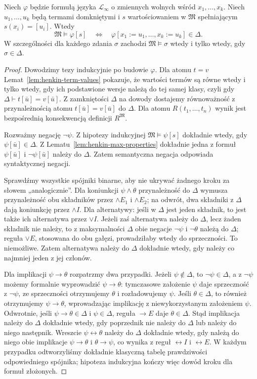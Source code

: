 \begin{twierdzenie}\label{thm:henkin-truth}
Niech $\varphi$ będzie formułą języka $\mathcal L_{\infty}$ o zmiennych wolnych wśród $x_1,\ldots,x_k$. Niech $u_1,\ldots,u_k$ będą termami domkniętymi i $s$ wartościowaniem w $\mathfrak M$ spełniającym $s(x_i)=[u_i]$. Wtedy
\[
\mathfrak M\models\varphi[s]
\quad\Longleftrightarrow\quad
\varphi[x_1:=u_1,\ldots,x_k:=u_k]\in\Delta.
\]
W szczególności dla każdego zdania $\sigma$ zachodzi $\mathfrak M\models\sigma$ wtedy i tylko wtedy, gdy $\sigma\in\Delta$.
\end{twierdzenie}
\begin{proof}
Dowodzimy tezy indukcyjnie po budowie $\varphi$. Dla atomu $t=v$ Lemat~\ref{lem:henkin-term-values} pokazuje, że wartości termów są równe wtedy i tylko wtedy, gdy ich podstawione wersje należą do tej samej klasy, czyli gdy $\Delta\vdash t[\bar u]=v[\bar u]$. Z zamkniętości $\Delta$ na dowody dostajemy równoważność z przynależnością atomu $t[\bar u]=v[\bar u]$ do $\Delta$. Dla atomu $R(t_1,\ldots,t_n)$ wynik jest bezpośrednią konsekwencją definicji $R^{\mathfrak M}$.

Rozważmy negację $\neg\psi$. Z hipotezy indukcyjnej
$\mathfrak M\models\psi[s]$ dokładnie wtedy, gdy
$\psi[\bar u]\in\Delta$. Z Lematu~\ref{lem:henkin-max-properties}
dokładnie jedna z formuł $\psi[\bar u]$ i
$\neg\psi[\bar u]$ należy do $\Delta$.
Zatem semantyczna negacja odpowiada syntaktycznej negacji.

Sprawdźmy wszystkie spójniki binarne, aby nie ukrywać
żadnego kroku za słowem „analogicznie”. Dla koniunkcji
$\psi\land\theta$ przynależność do $\Delta$ wymusza
przynależność obu składników przez $\land E_1$ i $\land E_2$;
na odwrót, dwa składniki z $\Delta$ dają koniunkcję przez
$\land I$. Dla alternatywy: jeśli w $\Delta$ jest jeden
składnik, to jest także ich alternatywa przez $\lor I$.
Jeżeli zaś alternatywa należy do $\Delta$, lecz żaden składnik
nie należy, to z maksymalności $\Delta$ obie negacje
$\neg\psi$ i $\neg\theta$ należą do $\Delta$;
reguła $\lor E$, stosowana do obu gałęzi,
prowadziłaby wtedy do sprzeczności. To niemożliwe.
Zatem alternatywa należy do $\Delta$ dokładnie wtedy,
gdy należy co najmniej jeden z jej członów.

Dla implikacji $\psi\to\theta$ rozpatrzmy dwa przypadki.
Jeżeli $\psi\notin\Delta$, to $\neg\psi\in\Delta$,
a z $\neg\psi$ możemy formalnie wyprowadzić
$\psi\to\theta$: tymczasowe założenie $\psi$
daje sprzeczność z $\neg\psi$,
ze sprzeczności otrzymujemy $\theta$ i rozładowujemy
$\psi$. Jeśli $\theta\in\Delta$, to również
otrzymujemy $\psi\to\theta$, wprowadzając implikację
z niewykorzystanym założeniem $\psi$.
Odwrotnie, jeśli $\psi\to\theta\in\Delta$
i $\psi\in\Delta$, reguła $\to E$ daje
$\theta\in\Delta$. Stąd implikacja należy do $\Delta$
dokładnie wtedy, gdy poprzednik nie należy do $\Delta$
lub należy do niego następnik.
Wreszcie $\psi\leftrightarrow\theta$ należy do $\Delta$
dokładnie wtedy, gdy należą do niego obie implikacje
$\psi\to\theta$ i $\theta\to\psi$, co wynika z
reguł $\leftrightarrow I$ i $\leftrightarrow E$.
W każdym przypadku odtworzyliśmy dokładnie klasyczną
tabelę prawdziwości odpowiedniego spójnika;
hipoteza indukcyjna kończy więc dowód kroku dla formuł złożonych.


\end{proof}
